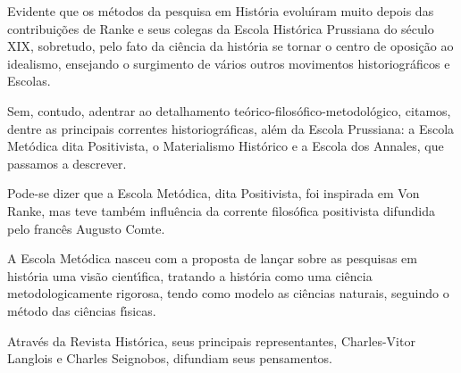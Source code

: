 \documentclass[
12pt,		%
openright,	%
twoside,  %
a4paper,			%
chapter=TITLE,		%
english,			%
french,				%
spanish,			%
brazil				%
]{USPSC-classe/USPSC}
\begin{document}
Evidente que os m\'etodos da pesquisa em Hist\'oria evolu\'{\i}ram muito depois das contribui\c{c}\~oes de Ranke e seus colegas da Escola Hist\'orica Prussiana do s\'eculo XIX, sobretudo, pelo fato da ci\^encia  da hist\'oria se tornar o centro de oposi\c{c}\~ao ao idealismo, ensejando o surgimento de v\'arios outros movimentos historiogr\'aficos e Escolas.









Sem, contudo, adentrar ao detalhamento te\'orico-filos\'ofico-metodol\'ogico, citamos, dentre as principais correntes historiogr\'aficas, al\'em da Escola Prussiana: a Escola Met\'odica dita Positivista, o Materialismo Hist\'orico e a Escola dos Annales, que passamos a descrever.









Pode-se dizer que a Escola Met\'odica, dita Positivista, foi inspirada em Von Ranke, mas teve tamb\'em influ\^encia da corrente filos\'ofica positivista difundida pelo franc\^es Augusto Comte.









A Escola Met\'odica nasceu com a proposta de  lan\c{c}ar sobre as pesquisas em hist\'oria uma vis\~ao cient\'{\i}fica, tratando a hist\'oria como uma ci\^encia metodologicamente rigorosa, tendo como modelo as ci\^encias naturais, seguindo o m\'etodo das ci\^encias f\'{\i}sicas.









Atrav\'es da Revista Hist\'orica, seus principais representantes, Charles-Vitor Langlois e Charles Seignobos, difundiam seus pensamentos.










\noindent\begin{center}\mbox{\centering{}}\end{center}
\end{document}
